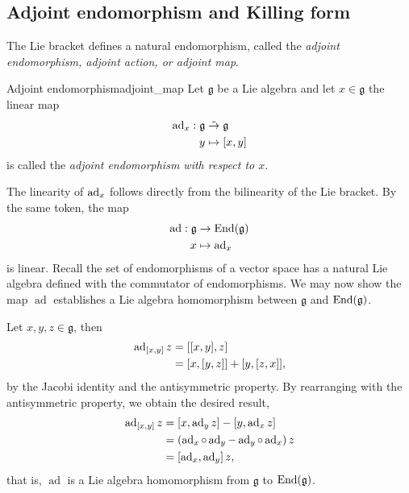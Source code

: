 \subsection{Adjoint endomorphism and Killing form}
The Lie bracket defines a natural endomorphism, called the \emph{adjoint endomorphism, adjoint action, or adjoint map}.
\begin{definition}{Adjoint endomorphism}{adjoint_map}
    Let \(\mathfrak{g}\) be a Lie algebra and let \(x \in \mathfrak{g}\) the linear map
    \begin{align*}
        \operatorname{ad}_{x} : \mathfrak{g} &\mathrel{\tilde{\to}} \mathfrak{g}\\
                            y &\mapsto [x,y]
    \end{align*}
    is called the \emph{adjoint endomorphism with respect to \(x\)}.
\end{definition}
The linearity of \(\operatorname{ad}_{x}\) follows directly from the bilinearity of the Lie bracket. By the same token, the map
\begin{align*}
    \operatorname{ad} : \mathfrak{g} &\to \operatorname{End}(\mathfrak{g})\\
                                   x &\mapsto \operatorname{ad}_{x}
\end{align*}
is linear. Recall the set of endomorphisms of a vector space has a natural Lie algebra defined with the commutator of endomorphisms. We may now show the map \(\operatorname{ad}\) establishes a Lie algebra homomorphism between \(\mathfrak{g}\) and \(\operatorname{End}(\mathfrak{g})\).

Let \(x, y, z \in \mathfrak{g}\), then
\begin{align*}
    \operatorname{ad}_{[x,y]}z &= [[x,y], z]\\
                &= [x, [y,z]] + [y, [z, x]],
\end{align*}
by the Jacobi identity and the antisymmetric property. By rearranging with the antisymmetric property, we obtain the desired result,
\begin{align*}
    \operatorname{ad}_{[x,y]}z &= [x, \operatorname{ad}_{y}z] - [y, \operatorname{ad}_{x}z]\\
                  &= \left(\operatorname{ad}_{x} \circ \operatorname{ad}_{y} - \operatorname{ad}_{y} \circ \operatorname{ad}_{x}\right)z\\
                  &= \left[\operatorname{ad}_{x}, \operatorname{ad}_{y}\right]z,
\end{align*}
that is, \(\operatorname{ad}\) is a Lie algebra homomorphism from \(\mathfrak{g}\) to \(\operatorname{End}(\mathfrak{g})\).

